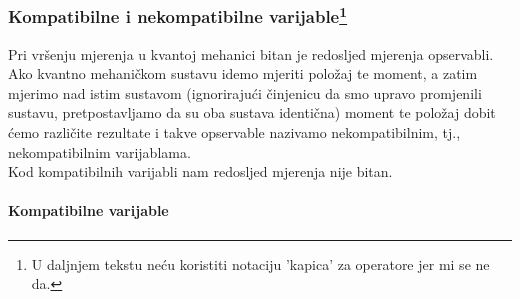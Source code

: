 \documentclass{article}
\numberwithin{equation}{section}
\begin{document}
\subsubsection{Kompatibilne i nekompatibilne varijable\footnote{U daljnjem tekstu neću koristiti notaciju 'kapica' za operatore jer mi se ne da.}}
Pri vršenju mjerenja u kvantoj mehanici bitan je redosljed mjerenja opservabli. Ako kvantno mehaničkom sustavu idemo mjeriti
položaj te moment, a zatim mjerimo nad istim sustavom (ignorirajući činjenicu da smo upravo promjenili sustavu,
pretpostavljamo da su oba sustava identična) moment te položaj dobit ćemo različite rezultate i takve opservable nazivamo nekompatibilnim,
tj., nekompatibilnim varijablama.\\
Kod kompatibilnih varijabli nam redosljed mjerenja nije bitan.
\paragraph{Kompatibilne varijable} 
\end{document}
